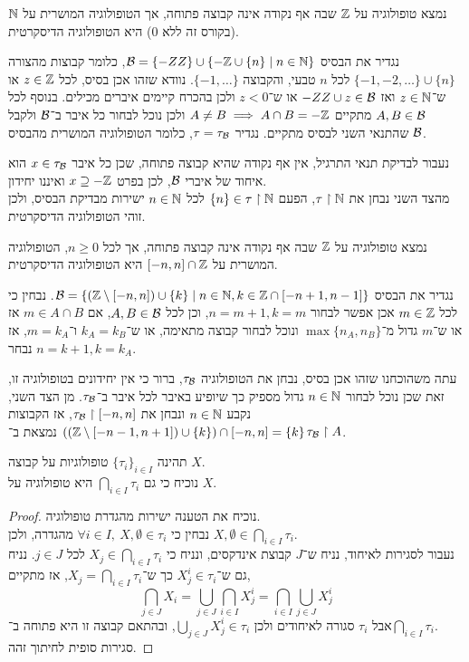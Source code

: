 \question{}
נמצא טופולוגיה על $\mathbb{Z}$ שבה אף נקודה אינה קבוצה פתוחה, אך הטופולוגיה המושרית על $\mathbb{N}$ (בקורס זה ללא 0) היא הטופולוגיה הדיסקרטית.
\begin{solution}
	נגדיר את הבסיס $\mathcal{B} = \{-ZZ\} \cup \{ -\mathbb{Z} \cup \{ n \} \mid n \in \mathbb{N} \}$, כלומר קבוצות מהצורה $\{ -1, -2, \dots \} \cup \{ n \}$ לכל $n$ טבעי, והקבוצה $\{-1, \dots\}$.
	נוודא שזהו אכן בסיס, לכל $z \in \mathbb{Z}$ או ש־$z \in \mathbb{N}$ ואז $-ZZ \cup {z} \in \mathcal{B}$ או ש־$z < 0$ ולכן בהכרח קיימים איברים מכילים.
	בנוסף לכל $A, B \in \mathcal{B}$ מתקיים $A \ne B \implies A \cap B = -\mathbb{Z}$ ולכן נוכל לבחור כל איבר ב־$\mathcal{B}$ ולקבל שהתנאי השני לבסיס מתקיים.
	נגדיר $\tau = \tau_{\mathcal{B}}$, כלומר הטופולוגיה המושרית מהבסיס $\mathcal{B}$.

	נעבור לבדיקת תנאי התרגיל, אין אף נקודה שהיא קבוצה פתוחה, שכן כל איבר $x \in \tau_{\mathcal{B}}$ הוא איחוד של איברי $\mathcal{B}$, לכן בפרט $x \supseteq -\mathbb{Z}$ ואיננו יחידון. \\
	מהצד השני נבחן את $\tau \restriction \mathbb{N}$, הפעם $\{ n \} \in \tau \restriction \mathbb{N}$ לכל $n \in \mathbb{N}$ ישירות מבדיקת הבסיס, ולכן זוהי הטופולוגיה הדיסקרטית.
\end{solution}

\subquestion{}
נמצא טופולוגיה על $\mathbb{Z}$ שבה אף נקודה אינה קבוצה פתוחה, אך לכל $n \ge 0$, הטופולוגיה המושרית על $[-n, n] \cap \mathbb{Z}$ היא הטופולוגיה הדיסקרטית.
\begin{solution}
	נגדיר את הבסיס $\mathcal{B} = \{ (\mathbb{Z} \setminus [-n, n]) \cup \{ k \} \mid n \in \mathbb{N}, k \in \mathbb{Z} \cap [-n + 1, n - 1] \}$.
	נבחין כי לכל $m \in \mathbb{Z}$ אכן אפשר לבחור $ n = m + 1, k = m$, וכן לכל $A, B \in \mathcal{B}$,
	אם $m \in A \cap B$ אז או ש־$m$ גדול מ־$\max\{ n_A, n_B \}$ ונוכל לבחור קבוצה מתאימה, או ש־$k_A = k_B$ ו־$m = k_A$, אז נבחר $n = k + 1, k = k_A$.

	עתה משהוכחנו שזהו אכן בסיס, נבחן את הטופולוגיה $\tau_{\mathcal{B}}$, ברור כי אין יחידונים בטופולוגיה זו, זאת שכן נוכל לבחור $n \in \mathbb{N}$ גדול מספיק כך שיופיע באיבר לכל איבר ב־$\tau_{\mathcal{B}}$.
	מן הצד השני, נקבע $n \in \mathbb{N}$ ונבחן את $\tau_{\mathcal{B}} \restriction [-n, n]$, אז הקבוצות $((\mathbb{Z} \setminus [-n - 1, n + 1]) \cup \{k\}) \cap [-n, n] = \{ k \}$ נמצאת ב־$\tau_{\mathcal{B}} \restriction A$.
\end{solution}

\question{}
\subquestion{}
תהינה ${\{\tau_i\}}_{i \in I}$ טופולוגיות על קבוצה $X$. \\
נוכיח כי גם $\bigcap_{i \in I} \tau_i$ היא טופולוגיה על $X$.
\begin{proof}
	נוכיח את הטענה ישירות מהגדרת טופולוגיה. \\
	נבחין כי $\forall i \in I,\ X, \emptyset \in \tau_i$ מהגדרה, ולכן $X, \emptyset \in \bigcap_{i \in I} \tau_i$. \\
	נעבור לסגירות לאיחוד, נניח ש־$J$ קבוצת אינדקסים, ונניח כי $X_j \in \bigcap_{i \in I} \tau_i$ לכל $j \in J$.
	נניח גם ש־$X_j^i \in \tau_i$ כך ש־$X_j = \bigcap_{i \in I} \tau_i$, אז מתקיים,
	\[
		\bigcap_{j \in J} X_i
		= \bigcup_{j \in J} \bigcap_{i \in I} X_j^i
		= \bigcap_{i \in I} \bigcup_{j \in J} X_j^i
	\]
	אבל $\tau_i$ סגורה לאיחודים ולכן $\bigcup_{j \in J} X_j^i \in \tau_i$, ובהתאם קבוצה זו היא פתוחה ב־$\bigcap_{i \in I} \tau_i$. \\
	סגירות סופית לחיתוך זהה.
\end{proof}

